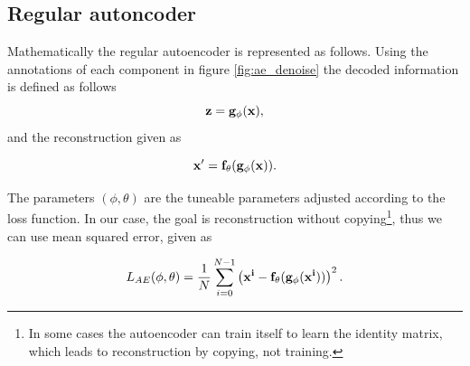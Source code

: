 \subsection{Regular autoncoder}
Mathematically the regular autoencoder is represented as follows\cite{weng2018VAE}. 
Using the annotations of each component in figure \ref{fig:ae_denoise} the decoded information is defined as follows 
\begin{equation*}
    \bf{z} = g_{\phi}(\bf{x}),
\end{equation*}    
and the reconstruction given as 

\begin{equation*}
    \bf{x'} = f_{\theta}(g_{\phi}(\bf{x})).
\end{equation*}  

The parameters $(\phi,\theta)$ are the tuneable parameters adjusted according to the loss function. In our case, the goal is
reconstruction without copying\footnote{In some cases the autoencoder can train itself to learn the identity matrix, 
which leads to reconstruction by copying, not training.}, thus we can use mean squared error, given as 

\begin{equation}\label{eq:loss_ae}
    L_{AE} (\phi,\theta) = \frac{1}{N}\sum_{i=0}^{N-1} \left(\bf{x}^{i} - f_{\theta}(g_{\phi}(\bf{x}^{i}))\right)^{2}.
\end{equation}

